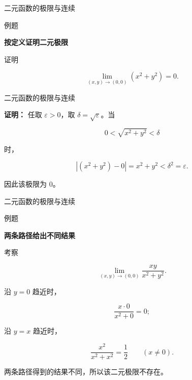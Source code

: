 \documentclass[aspectratio=169,10pt,fontset=fandol]{ctexbeamer}
\newenvironment{custom}[1]{\par\noindent\textbf{#1}\quad}{\par\vspace{0.8em}}
\begin{document}
\begin{frame}[t,fragile]{二元函数的极限与连续}
\normalsize
\begin{block}{例题}
{\normalsize
\textbf{按定义证明二元极限}\par


	证明

	\[

	\lim_{(x,y)\to(0,0)}(x^2+y^2)=0.

	\]


}
\end{block}
\end{frame}
\begin{frame}[t,fragile]{二元函数的极限与连续}
\normalsize
{\normalsize
\textbf{证明：}
任取 \(\varepsilon>0\)，取 \(\delta=\sqrt{\varepsilon}\)。当

	\[

	0<\sqrt{x^2+y^2}<\delta

	\]

	时，

	\[

	|(x^2+y^2)-0|=x^2+y^2<\delta^2=\varepsilon.

	\]

	因此该极限为 \(0\)。


}
\end{frame}
\begin{frame}[t,fragile]{二元函数的极限与连续}
\normalsize
\begin{block}{例题}
{\normalsize
\textbf{两条路径给出不同结果}\par


	考察

	\[

	\lim_{(x,y)\to(0,0)}\frac{xy}{x^2+y^2}.

	\]

	沿 \(y=0\) 趋近时，

	\[

	\frac{x\cdot0}{x^2+0}=0;

	\]

	沿 \(y=x\) 趋近时，

	\[

	\frac{x^2}{x^2+x^2}=\frac12\qquad(x\neq0).

	\]

	两条路径得到的结果不同，所以该二元极限不存在。


}
\end{block}
\end{frame}
\end{document}
